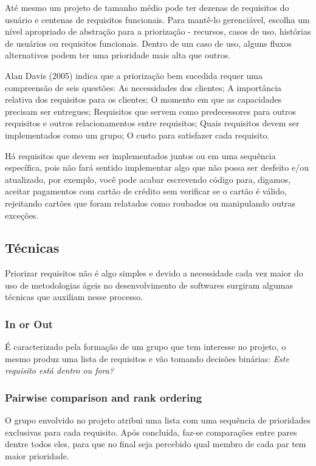 \documentclass[runningheads]{llncs}
\begin{document}
Até mesmo um projeto de tamanho médio pode ter dezenas de requisitos do usuário e centenas de requisitos funcionais. Para mantê-lo gerenciável, escolha um nível apropriado de abstração para a priorização - recursos, casos de uso, histórias de usuários ou requisitos funcionais. Dentro de um caso de uso, alguns fluxos alternativos podem ter uma prioridade mais alta que outros.

Alan Davis (2005) indica que a priorização bem sucedida requer uma compreensão de seis questões: As necessidades dos clientes; A importância relativa dos requisitos para os clientes; O momento em que as capacidades precisam ser entregues; Requisitos que servem como predecessores para outros requisitos e outros relacionamentos entre requisitos; Quais requisitos devem ser implementados como um grupo; O custo para satisfazer cada requisito.

Há requisitos que devem ser implementados juntos ou em uma sequência específica, pois não fará sentido implementar algo que não possa ser desfeito e/ou atualizado, por exemplo, você pode acabar escrevendo código para, digamos, aceitar pagamentos com cartão de crédito sem verificar se o cartão é válido, rejeitando cartões que foram relatados como roubados ou manipulando outras exceções.

\subsection{Técnicas}

Priorizar requisitos não é algo simples e devido a necessidade cada vez maior do uso de metodologias ágeis no desenvolvimento de softwares surgiram algumas técnicas que auxiliam nesse processo.

\subsubsection{In or Out}
É caracterizado pela formação de um grupo que tem interesse no projeto, o mesmo produz uma lista de requisitos e vão tomando decisões binárias: \textit{Este requisito está dentro ou fora?}

\subsubsection{Pairwise comparison and rank ordering}
O grupo envolvido no projeto atribui uma lista com uma sequência de prioridades exclusivas para cada requisito. Após concluída, faz-se comparações entre pares dentre todos eles, para que no final seja percebido qual membro de cada par tem maior prioridade.
\end{document}
